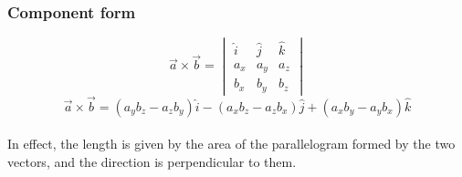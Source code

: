 \subsubsection{Component form}
\begin{equation}
    \vec{a} \times \vec{b} = \begin{vmatrix}
        \hat{i} & \hat{j} & \hat{k} \\
        a_x     & a_y     & a_z     \\
        b_x     & b_y     & b_z
    \end{vmatrix}
\end{equation}
\begin{equation}
    \vec{a} \times \vec{b} = (a_y b_z - a_z b_y) \hat{i} - (a_x b_z - a_z b_x) \hat{j} + (a_x b_y - a_y b_x) \hat{k}
\end{equation} \\
In effect, the length is given by the area of the parallelogram formed by the two vectors, and the direction is perpendicular to them.
